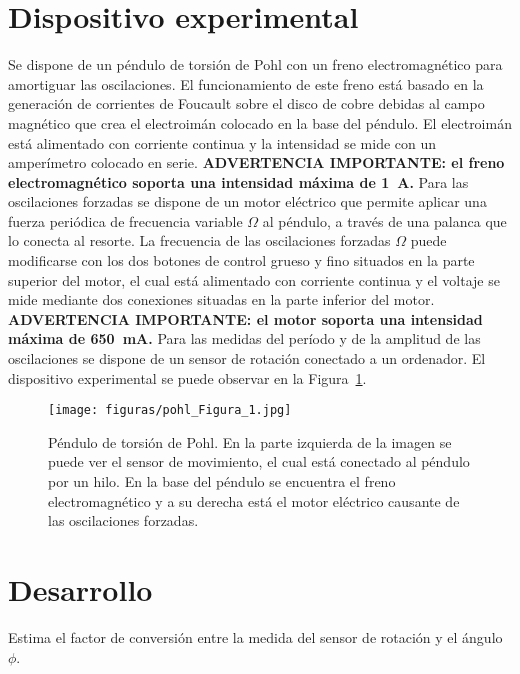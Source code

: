 \documentclass[11pt]{articulo}
\begin{document}
\section{Dispositivo experimental}

Se dispone de un p\'endulo de torsi\'on de Pohl con un freno electromagn\'etico para amortiguar las oscilaciones. El funcionamiento de este freno est\'a basado en la generaci\'on de corrientes de Foucault sobre el disco de cobre debidas al campo magn\'etico que crea el electroim\'an colocado en la base del p\'endulo. El electroim\'an est\'a alimentado con corriente continua y la intensidad se mide con un amper\'imetro colocado en serie. {\bf ADVERTENCIA IMPORTANTE: el freno electromagn\'etico soporta una intensidad m\'axima de 1~A.} Para las oscilaciones forzadas se dispone de un motor el\'ectrico que permite aplicar una fuerza peri\'odica de frecuencia variable $\Omega$ al p\'endulo, a trav\'es de una palanca que lo conecta al resorte. La frecuencia de las oscilaciones forzadas $\Omega$ puede modificarse con los dos botones de control grueso y fino situados en la parte superior del motor, el cual est\'a alimentado con corriente continua y el voltaje se mide mediante dos conexiones situadas en la parte inferior del motor. {\bf ADVERTENCIA IMPORTANTE: el motor soporta una intensidad m\'axima de 650~mA.} Para las medidas del per\'iodo y de la amplitud de las oscilaciones se dispone de un sensor de rotaci\'on conectado a un ordenador. El dispositivo experimental se puede observar en la Figura~\ref{pohl}.
%
\begin{figure}[htb]
\begin{center}
\hspace*{0.0cm}
\texttt{[image: figuras/pohl\_Figura\_1.jpg]}
\end{center}
\vspace*{-0.6cm}
\caption[]{\label{pohl}{P\'endulo de torsi\'on de Pohl. En la parte izquierda de la imagen se puede ver el sensor de movimiento, el cual est\'a conectado al p\'endulo por un hilo. En la base del p\'endulo se encuentra el freno electromagn\'etico y a su derecha est\'a el motor el\'ectrico causante de las oscilaciones forzadas.}}
\end{figure}


\section{Desarrollo}

Estima el factor de conversi\'on entre la medida del sensor de rotaci\'on y el \'angulo $\phi$.
\end{document}
